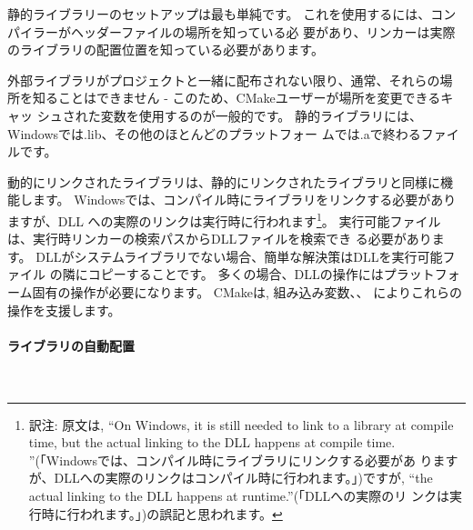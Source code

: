 \documentclass[uplatex,11pt,a4paper,landscape,dvipdfmx]{jsarticle} %
\newcommand{\sectiontitle}[1]{\paragraph{#1} \ \\} %
\begin{document}
\begin{multicols}{2}
静的ライブラリーのセットアップは最も単純です。
これを使用するには、コンパイラーがヘッダーファイルの場所を知っている必
要があり、リンカーは実際のライブラリの配置位置を知っている必要があります。

外部ライブラリがプロジェクトと一緒に配布されない限り、通常、それらの場
所を知ることはできません - このため、CMakeユーザーが場所を変更できるキャッ
シュされた変数を使用するのが一般的です。
静的ライブラリには、Windowsでは.lib、その他のほとんどのプラットフォー
ムでは.aで終わるファイルです。




動的にリンクされたライブラリは、静的にリンクされたライブラリと同様に機
能します。
Windowsでは、コンパイル時にライブラリをリンクする必要がありますが、DLL
への実際のリンクは実行時に行われます\footnote{訳注: 原文は, ``On
  Windows, it is still needed to link to a library at compile time,
  but the actual linking to the DLL happens at compile
  time. ''(「Windowsでは、コンパイル時にライブラリにリンクする必要があ
    りますが、DLLへの実際のリンクはコンパイル時に行われます。」)ですが,
  ``the actual linking to the DLL happens at runtime.''(「DLLへの実際のリ
  ンクは実行時に行われます。」)の誤記と思われます。}。
実行可能ファイルは、実行時リンカーの検索パスからDLLファイルを検索でき
る必要があります。
DLLがシステムライブラリでない場合、簡単な解決策はDLLを実行可能ファイル
の隣にコピーすることです。
多くの場合、DLLの操作にはプラットフォーム固有の操作が必要になります。
CMakeは, 組み込み変数、、
によりこれらの操作を支援します。



\sectiontitle{ライブラリの自動配置}



\end{multicols}
\end{document}

